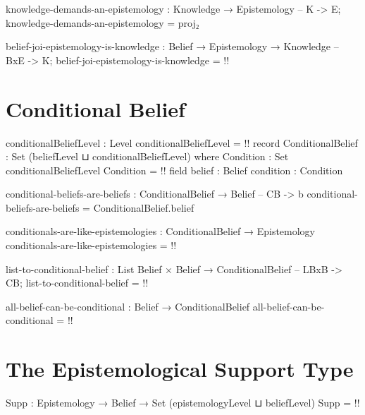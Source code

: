 \documentclass{article}
\begin{document}
\begin{code}
knowledge-demands-an-epistemology :
  Knowledge → Epistemology -- K -> E;
knowledge-demands-an-epistemology = proj₂
\end{code}

\begin{code}
belief-joi-epistemology-is-knowledge :
  Belief → Epistemology → Knowledge -- BxE -> K;
belief-joi-epistemology-is-knowledge = {!!}
\end{code}

\section{Conditional Belief}

\begin{code}
conditionalBeliefLevel : Level
conditionalBeliefLevel = {!!}
record ConditionalBelief : Set (beliefLevel ⊔ conditionalBeliefLevel) where
  Condition : Set conditionalBeliefLevel
  Condition = {!!}
  field
    belief : Belief
    condition : Condition
\end{code}

\begin{code}
conditional-beliefs-are-beliefs : ConditionalBelief → Belief -- CB -> b
conditional-beliefs-are-beliefs = ConditionalBelief.belief
\end{code}

\begin{code}
conditionals-are-like-epistemologies :
  ConditionalBelief → Epistemology
conditionals-are-like-epistemologies = {!!}
\end{code}

\begin{code}
list-to-conditional-belief :
  List Belief × Belief → ConditionalBelief  -- LBxB -> CB;
list-to-conditional-belief = {!!}
\end{code}

\begin{code}
all-belief-can-be-conditional : Belief → ConditionalBelief
all-belief-can-be-conditional = {!!}
\end{code}

\section{The Epistemological Support Type}

\begin{code}
Supp : Epistemology → Belief → Set (epistemologyLevel ⊔ beliefLevel)
Supp = {!!}
\end{code}
\end{document}
